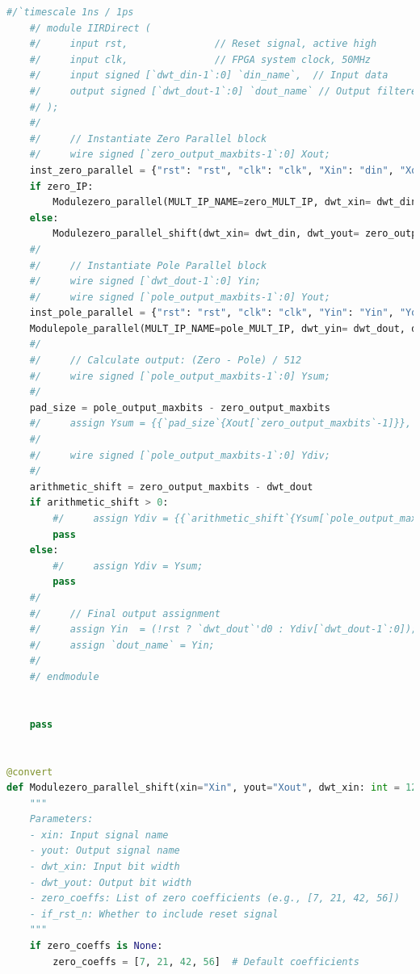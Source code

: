 \begin{lstlisting}[language=python,caption = {IIR滤波器的参数化设计}]
    #/`timescale 1ns / 1ps
    #/ module IIRDirect (
    #/     input rst,               // Reset signal, active high
    #/     input clk,               // FPGA system clock, 50MHz
    #/     input signed [`dwt_din-1`:0] `din_name`,  // Input data
    #/     output signed [`dwt_dout-1`:0] `dout_name` // Output filtered data
    #/ );
    #/ 
    #/     // Instantiate Zero Parallel block
    #/     wire signed [`zero_output_maxbits-1`:0] Xout;
    inst_zero_parallel = {"rst": "rst", "clk": "clk", "Xin": "din", "Xout": "Xout"}
    if zero_IP:
        Modulezero_parallel(MULT_IP_NAME=zero_MULT_IP, dwt_xin= dwt_din, dwt_yout= zero_output_maxbits, if_rst_n=True, zero_coeffs= num_coeffs, PORTS = inst_zero_parallel)
    else:
        Modulezero_parallel_shift(dwt_xin= dwt_din, dwt_yout= zero_output_maxbits, if_rst_n=True, zero_coeffs= num_coeffs, PORTS = inst_zero_parallel)
    #/ 
    #/     // Instantiate Pole Parallel block
    #/     wire signed [`dwt_dout-1`:0] Yin;
    #/     wire signed [`pole_output_maxbits-1`:0] Yout;
    inst_pole_parallel = {"rst": "rst", "clk": "clk", "Yin": "Yin", "Yout": "Yout"}
    Modulepole_parallel(MULT_IP_NAME=pole_MULT_IP, dwt_yin= dwt_dout, dwt_yout= pole_output_maxbits, if_rst_n=True, pole_coeffs= denom_coeffs, PORTS = inst_pole_parallel)
    #/ 
    #/     // Calculate output: (Zero - Pole) / 512
    #/     wire signed [`pole_output_maxbits-1`:0] Ysum;
    #/
    pad_size = pole_output_maxbits - zero_output_maxbits
    #/     assign Ysum = {{`pad_size`{Xout[`zero_output_maxbits`-1]}}, Xout} - Yout;
    #/ 
    #/     wire signed [`pole_output_maxbits-1`:0] Ydiv;
    #/ 
    arithmetic_shift = zero_output_maxbits - dwt_dout
    if arithmetic_shift > 0:
        #/     assign Ydiv = {{`arithmetic_shift`{Ysum[`pole_output_maxbits-1`]}}, Ysum[`pole_output_maxbits-1`:`arithmetic_shift`]}; // Arithmetic shift the numerator result `arithmetic_shift` bits to fit denominator's input size
        pass
    else:
        #/     assign Ydiv = Ysum;
        pass
    #/ 
    #/     // Final output assignment
    #/     assign Yin  = (!rst ? `dwt_dout`'d0 : Ydiv[`dwt_dout-1`:0]);
    #/     assign `dout_name` = Yin;
    #/ 
    #/ endmodule


    pass
    

@convert
def Modulezero_parallel_shift(xin="Xin", yout="Xout", dwt_xin: int = 12, dwt_yout: int = 26, zero_coeffs=None, if_rst_n=True):
    """
    Parameters:
    - xin: Input signal name
    - yout: Output signal name
    - dwt_xin: Input bit width
    - dwt_yout: Output bit width
    - zero_coeffs: List of zero coefficients (e.g., [7, 21, 42, 56])
    - if_rst_n: Whether to include reset signal
    """
    if zero_coeffs is None:
        zero_coeffs = [7, 21, 42, 56]  # Default coefficients
        

\end{lstlisting}

